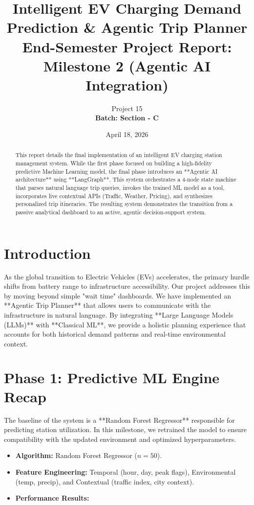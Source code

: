 \documentclass{article}
\title{Intelligent EV Charging Demand Prediction \& Agentic Trip Planner \\ \large End-Semester Project Report: Milestone 2 (Agentic AI Integration)}
\author{Project 15 \\ \textbf{Batch: Section - C}}
\date{April 18, 2026}
\begin{document}
\maketitle

\begin{abstract}
This report details the final implementation of an intelligent EV charging station management system. While the first phase focused on building a high-fidelity predictive Machine Learning model, the final phase introduces an **Agentic AI architecture** using **LangGraph**. This system orchestrates a 4-node state machine that parses natural language trip queries, invokes the trained ML model as a tool, incorporates live contextual APIs (Traffic, Weather, Pricing), and synthesizes personalized trip itineraries. The resulting system demonstrates the transition from a passive analytical dashboard to an active, agentic decision-support system.
\end{abstract}

\section{Introduction}
As the global transition to Electric Vehicles (EVs) accelerates, the primary hurdle shifts from battery range to infrastructure accessibility. Our project addresses this by moving beyond simple "wait time" dashboards. We have implemented an **Agentic Trip Planner** that allows users to communicate with the infrastructure in natural language. By integrating **Large Language Models (LLMs)** with **Classical ML**, we provide a holistic planning experience that accounts for both historical demand patterns and real-time environmental context.

\section{Phase 1: Predictive ML Engine Recap}
The baseline of the system is a **Random Forest Regressor** responsible for predicting station utilization. In this milestone, we retrained the model to ensure compatibility with the updated environment and optimized hyperparameters.

\begin{itemize}
    \item \textbf{Algorithm:} Random Forest Regressor ($n=50$).
    \item \textbf{Feature Engineering:} Temporal (hour, day, peak flags), Environmental (temp, precip), and Contextual (traffic index, city context).
    \item \textbf{Performance Results:}
\end{itemize}
\end{document}
